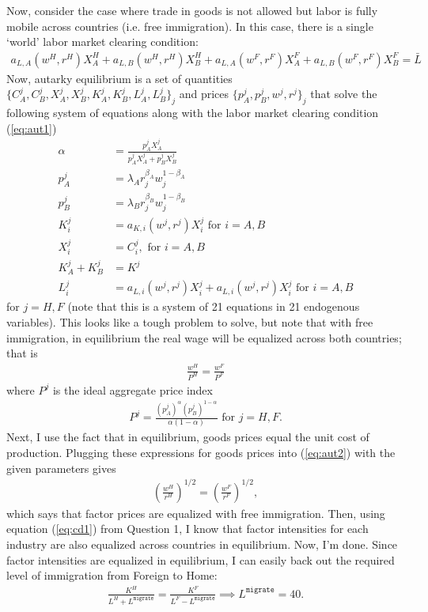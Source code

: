 \documentclass[12pt]{article}
\begin{document}
Now, consider the case where trade in goods is not allowed but labor is fully mobile across countries (i.e. free immigration). In this case, there is a single `world' labor market clearing condition:
\begin{align}
a_{L,A}(w^H,r^H) X^H_A+ a_{L,B}(w^H,r^H) X^H_B + a_{L,A}(w^F,r^F) X^F_A+ a_{L,B}(w^F,r^F) X^F_B=\bar L \label{eq:aut1}
\end{align}
Now, autarky equilibrium is a set of quantities $\{C^j_A,C^j_B,X^j_A,X^j_B,K^j_A,K^j_B,L^j_A,L^j_B\}_j$ and prices $\{p^j_A,p^j_B,w^j,r^j\}_j$ that solve the following system of equations along with the labor market clearing condition (\ref{eq:aut1})
\begin{align*}
\alpha  &= {\frac{p_A^jX_A^j}{p^j_AX_A^j + p_B^jX_B^j}}\\
p^j_A &= \lambda_A r_j^{\beta_A}w_j^{1-\beta_A} \\
p^j_B &= \lambda_B r_j^{\beta_B}w_j^{1-\beta_B} \\
K^j_i &= a_{K,i}(w^j,r^j) X^j_i  \text{ for } i = A,B \\
X^j_i &= C^j_i, \text{ for } i = A,B \\
K^j_A + K^j_B &= K^j\\
L_i^j &= a_{L,i}(w^j,r^j) X^j_i+ a_{L,i}(w^j,r^j) X^j_i \text{ for } i = A,B
\end{align*}
for $j = H,F$ (note that this is a system of 21 equations in 21 endogenous variables). This looks like a tough problem to solve, but note that with free immigration, in equilibrium the real wage will be equalized across both countries; that is
\begin{align}
\frac{w^H}{P^H} = \frac{w^F}{P^F} \label{eq:aut2}
\end{align}
where $P^j$ is the ideal aggregate price index
\begin{align*}
P^j = \frac{(p_A^j)^\alpha(p_B^j)^{1-\alpha}}{\alpha (1-\alpha)} \text{ for } j = H,F.
\end{align*}
Next, I use the fact that in equilibrium, goods prices equal the unit cost of production. Plugging these expressions for goods prices into (\ref{eq:aut2}) with the given parameters gives
\begin{align*}
\left(\frac{w^H}{r^H}\right)^{1/2} = \left(\frac{w^F}{r^F}\right)^{1/2},
\end{align*}
which says that factor prices are equalized with free immigration. Then, using equation (\ref{eq:cd1}) from Question 1, I know that factor intensities for each industry are also equalized across countries in equilibrium. Now, I'm done. Since factor intensities are equalized in equilibrium, I can easily back out the required level of immigration from Foreign to Home:
\begin{align*}
\frac{K^H}{L^H + L^{\texttt{migrate}}} = \frac{K^F}{L^F - L^{\texttt{migrate}}} \implies L^{\texttt{migrate}}=40.
\end{align*}
\end{document}
